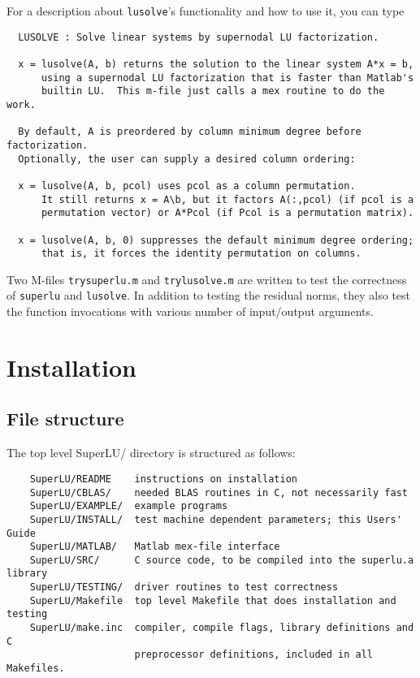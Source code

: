 \noindent For a description about {\tt lusolve}'s functionality and how
to use it, you can type

 \hspace{.4in}{\tt help lusolve}


\begin{verbatim}
  LUSOLVE : Solve linear systems by supernodal LU factorization.
 
  x = lusolve(A, b) returns the solution to the linear system A*x = b,
      using a supernodal LU factorization that is faster than Matlab's 
      builtin LU.  This m-file just calls a mex routine to do the work.

  By default, A is preordered by column minimum degree before factorization.
  Optionally, the user can supply a desired column ordering:

  x = lusolve(A, b, pcol) uses pcol as a column permutation.  
      It still returns x = A\b, but it factors A(:,pcol) (if pcol is a 
      permutation vector) or A*Pcol (if Pcol is a permutation matrix).
       
  x = lusolve(A, b, 0) suppresses the default minimum degree ordering;
      that is, it forces the identity permutation on columns.
\end{verbatim}

Two M-files {\tt trysuperlu.m} and {\tt trylusolve.m} are written to test the 
correctness of {\tt superlu} and {\tt lusolve}. In addition to testing the
residual norms, they also test the function invocations with various
number of input/output arguments.


\section{Installation}
\label{sec:install}
\subsection{File structure}
The top level SuperLU/ directory is structured as follows:
\begin{verbatim}
    SuperLU/README    instructions on installation
    SuperLU/CBLAS/    needed BLAS routines in C, not necessarily fast
    SuperLU/EXAMPLE/  example programs
    SuperLU/INSTALL/  test machine dependent parameters; this Users' Guide
    SuperLU/MATLAB/   Matlab mex-file interface
    SuperLU/SRC/      C source code, to be compiled into the superlu.a library
    SuperLU/TESTING/  driver routines to test correctness
    SuperLU/Makefile  top level Makefile that does installation and testing
    SuperLU/make.inc  compiler, compile flags, library definitions and C
                      preprocessor definitions, included in all Makefiles.
\end{verbatim}

